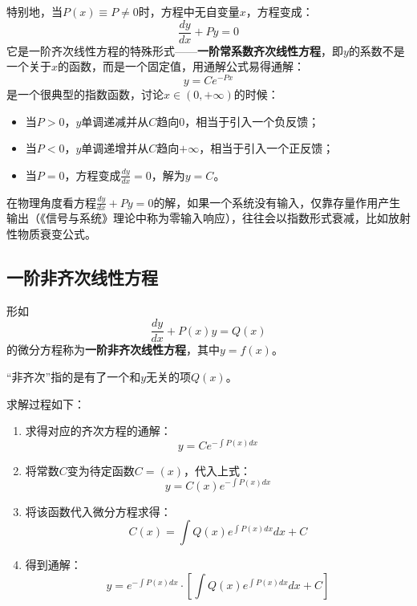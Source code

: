 特别地，当$P\left( x \right) \equiv P\ne 0$时，方程中无自变量$x$，方程变成：
\[
\frac{dy}{dx}+Py=0
\]
它是一阶齐次线性方程的特殊形式——{\bf 一阶常系数齐次线性方程}，即$y$的系数不是一个关于$x$的函数，而是一个固定值，用通解公式易得通解：
\[
y=Ce^{-Px}
\]
是一个很典型的指数函数，讨论$x\in \left( 0,+\infty \right) $的时候：
\begin{itemize}
    \item 当$P>0$，$y$单调递减并从$C$趋向0，相当于引入一个负反馈；
    \item 当$P<0$，$y$单调递增并从$C$趋向$+\infty $，相当于引入一个正反馈；
    \item 当$P=0$，方程变成$\frac{dy}{dx}=0$，解为$y=C$。
\end{itemize}

\begin{tcolorbox}
在物理角度看方程$\frac{dy}{dx}+Py=0$的解，如果一个系统没有输入，仅靠存量作用产生输出（《信号与系统》理论中称为零输入响应），往往会以指数形式衰减，比如放射性物质衰变公式。
\end{tcolorbox}

\subsection{一阶非齐次线性方程}

\begin{definition}[一阶非齐次线性方程]
形如
\[
\frac{dy}{dx}+P\left( x \right) y=Q\left( x \right)
\]
的微分方程称为{\bf 一阶非齐次线性方程}，其中$y=f\left( x \right) $。
\end{definition}

\begin{tcolorbox}
“非齐次”指的是有了一个和$y$无关的项$Q\left( x \right) $。
\end{tcolorbox}

求解过程如下：
\begin{enumerate}
    \item 求得对应的齐次方程的通解：
    \[
    y=Ce^{-\int{P\left( x \right) dx}}
    \]
    \item 将常数$C$变为待定函数$C=\left( x \right) $，代入上式：
    \[
    y=C\left( x \right) e^{-\int{P\left( x \right) dx}}
    \]
    \item 将该函数代入微分方程求得：
    \[
    C\left( x \right) =\int{Q\left( x \right) e^{\int{P\left( x \right) dx}}dx}+C
    \]
    \item 得到通解：
    \[
    y=e^{-\int{P\left( x \right) dx}}\cdot \left[ \int{Q\left( x \right) e^{\int{P\left( x \right) dx}}dx}+C \right]
    \]
\end{enumerate}

